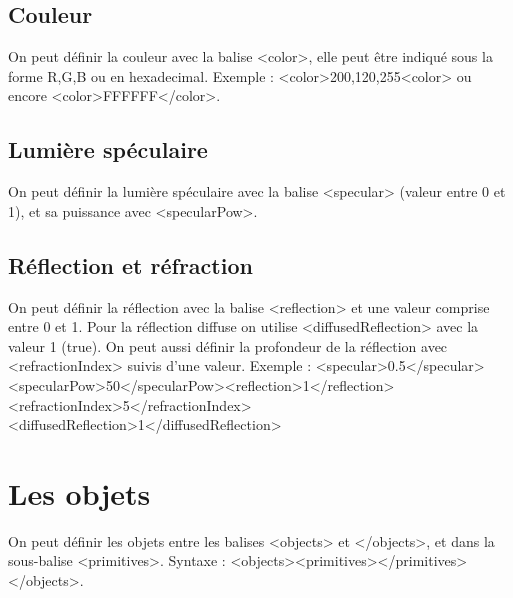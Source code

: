 \documentclass{report}
\begin{document}
\section{Couleur}
On peut d\'efinir la couleur avec la balise <color>, elle peut \^etre indiqu\'e sous la forme R,G,B ou en hexadecimal.
\newline Exemple : <color>200,120,255<color> ou encore <color>FFFFFF</color>.
\section{Lumi\`ere sp\'eculaire}
On peut d\'efinir la lumi\`ere sp\'eculaire avec la balise <specular> (valeur entre 0 et 1), et sa puissance avec <specularPow>.
\section{R\'eflection et r\'efraction}
On peut d\'efinir la r\'eflection avec la balise <reflection> et une valeur comprise entre 0 et 1.
\newline Pour la r\'eflection diffuse on utilise <diffusedReflection> avec la valeur 1 (true).
\newline On peut aussi d\'efinir la profondeur de la r\'eflection avec <refractionIndex> suivis d'une valeur.
\newline Exemple :
\newline <specular>0.5</specular>\newline <specularPow>50</specularPow>\newline<reflection>1</reflection>\newline<refractionIndex>5</refractionIndex>\newline<diffusedReflection>1</diffusedReflection>
\chapter{Les objets}
On peut d\'efinir les objets entre les balises <objects> et </objects>, et dans la sous-balise <primitives>.
\newline Syntaxe : <objects>\newline<primitives>\newline</primitives>\newline</objects>.
\end{document}
